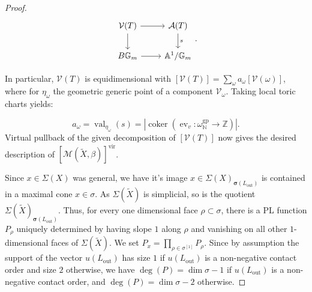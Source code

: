 \documentclass[12pt, oneside]{amsart}   	%
\newcommand{\NN}{\mathbb{N}}
\newcommand{\ZZ}{\mathbb{Z}}
\newcommand{\val}{\operatorname{val}}
\newcommand{\vir}{\operatorname{vir}}
\newcommand{\ev}{\operatorname{ev}}
\newcommand{\gp}{\operatorname{gp}}
\newcommand{\out}{\operatorname{out}}
\newcommand{\coker}{\operatorname{coker}}
\numberwithin{equation}{section}
\numberwithin{thm}{section}
\numberwithin{figure}{section}
\begin{document}
\begin{proof}
\begin{equation}
\begin{tikzcd}
\mathcal{V}(T) \arrow{r} \arrow[d] & \mathcal{A}(T)\arrow[d,"s"]\\
B\mathbb{G}_m \arrow[r] & \mathbb{A}^1/\mathbb{G}_m
\end{tikzcd}.
\end{equation}

In particular, $\mathcal{V}(T)$ is equidimensional with $[\mathcal{V}(T)] = \sum_{\omega} a_\omega[\mathcal{V}(\omega)]$, where for $\eta_{\omega}$ the geometric generic point of a component $\mathcal{V}_{\omega}$. Taking local toric charts yields:

\begin{equation}\label{multi}
a_\omega = \val_{\eta_{\omega}}(s) = |\coker(\ev_v:\omega_{\NN}^{\gp} \rightarrow \ZZ)|.
\end{equation}
Virtual pullback of the given decomposition of $[\mathcal{V}(T)]$ now gives the desired description of $[\mathscr{M}(\widetilde{X},\beta)]^{\vir}$.

 
Since $x \in \Sigma(X)$ was general, we have it's image $x\in \Sigma(X)_{\pmb\sigma(L_{\out})}$ is contained in a maximal cone $x \in \sigma$. As $\Sigma(\widetilde{X})$ is simplicial, so is the quotient $ \Sigma(\widetilde{X})_{\pmb\sigma(L_{\out})}$. Thus, for every one dimensional face $\rho \subset \sigma$, there is a PL function $P_{\rho}$ uniquely determined by having slope $1$ along $\rho$ and vanishing on all other $1$-dimensional faces of $\Sigma(\widetilde{X})$. We set $P_x = \prod_{\rho \in \sigma^{[1]}} P_{\rho}$. Since by assumption the support of the vector $u(L_{\out})$ has size $1$ if $u(L_{\out})$ is a non-negative contact order and size $2$ otherwise, we have $\deg(P) = \dim \sigma-1$ if $u(L_{\out})$ is a non-negative contact order, and $\deg(P) = \dim \sigma - 2$ otherwise.



\end{proof}
\end{document}
